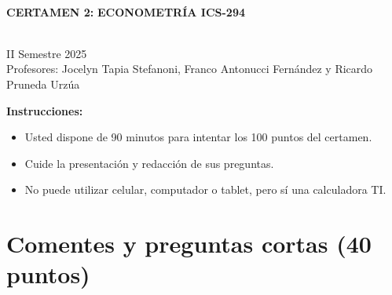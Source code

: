 \documentclass[10pt,a4paper]{article}
\begin{document}
\vspace{5cm}



\begin{center}
\begin{large}
\textbf{\\CERTAMEN 2:}\textbf{ ECONOMETRÍA ICS-294}
\end{large}\\
\vspace{0.2cm}
II Semestre 2025\\
Profesores: Jocelyn Tapia Stefanoni, Franco Antonucci Fernández y Ricardo Pruneda Urz\'ua\\
\end{center}

\textbf{Instrucciones:} 

\begin{itemize}

    \item Usted dispone de 90 minutos  para intentar los 100 puntos del certamen.
    \item Cuide la presentación y redacción de sus preguntas.
    \item No puede utilizar celular, computador o tablet, pero sí una calculadora TI.
     
\end{itemize}

\section{Comentes y preguntas cortas (40 puntos)}
\end{document}
